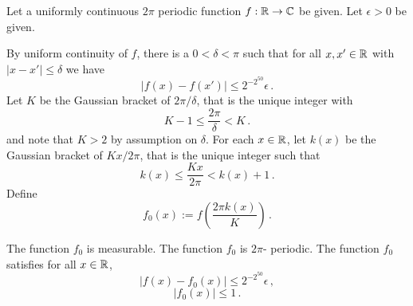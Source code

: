 Let a uniformly continuous $2\pi$ periodic function $f:\mathbb{R}\to \mathbb{C}$ be given. Let $\epsilon>0$ be given.

By uniform  continuity of $f$, there is a $0<\delta<\pi$
such that for all $x,x' \in \mathbb{R}$ with $|x-x'|\le \delta$
we have
\begin{equation}\label{uniconbound}
|f(x)-f(x')|\le 2^{-2^{50}}\epsilon\, .
\end{equation}
Let $K$ be the Gaussian bracket of $2\pi/\delta$, that is the unique integer with
\begin{equation}
    K-1\le  \frac{2\pi}{\delta} < K\, .
\end{equation}
and note that $K>2$ by assumption on $\delta$.
For each $x\in \mathbb{R}$, let $k(x)$ be the Gaussian bracket of $Kx/2\pi$, that is the unique integer such that
\begin{equation}\label{definekx}
k(x)\le \frac{Kx}{2\pi}<k(x)+1\, .
\end{equation}
Define
\begin{equation}\label{def fzero}
f_0(x):=f\left(\frac{2\pi k(x)}{K}\right)\, .
\end{equation}
\begin{lemma}
The function $f_0$ is measurable.
The function $f_0$ is $2\pi $- periodic.
The function $f_0$ satisfies  for all $x\in \mathbb{R}$,
\begin{equation}\label{eq ffzero}
|f(x)-f_0(x)|\le  2^{-2^{50}} \epsilon\, ,
\end{equation}
\begin{equation}\label{eq ffzero}
|f_0(x)|\le  1\, .
\end{equation}
\end{lemma}

